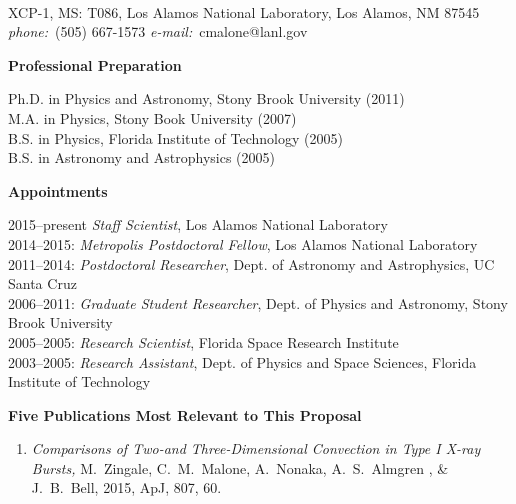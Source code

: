 \documentclass[11pt,letterpaper,english]{article}
\begin{document}
\setlength{\parindent}{0in} %

\pagestyle{fancy}   \renewcommand{%
\headrulewidth}{0.0pt}



\\
{ XCP-1, MS: T086, Los Alamos National Laboratory, Los Alamos, NM 87545} \\
{\it phone:}~(505) 667-1573 \hskip 2mm
{\it e-mail:}~cmalone@lanl.gov \hskip 2mm 

\begin{flushleft} {\bf Professional Preparation}
{\parindent 16pt

Ph.D. in Physics and Astronomy, Stony Brook University (2011)\\ 
M.A. in Physics, Stony Book University (2007)\\ 
B.S. in Physics, Florida Institute of Technology (2005)\\ 
B.S. in Astronomy and Astrophysics (2005)\\
}

\vspace{.04in}
{\bf Appointments}
{\parindent 16pt

2015--present {\em Staff Scientist}, Los Alamos National Laboratory \\
2014--2015: {\em Metropolis Postdoctoral Fellow}, Los Alamos National Laboratory \\ 
2011--2014: {\em Postdoctoral Researcher}, Dept. of Astronomy and Astrophysics, UC Santa Cruz\\ 
2006--2011: {\em Graduate Student Researcher}, Dept. of Physics and Astronomy, Stony Brook University  \\ 
2005--2005: {\em Research Scientist}, Florida Space Research Institute \\
2003--2005: {\em Research Assistant}, Dept. of Physics and Space Sciences, Florida Institute of Technology
}

\vspace{.04in}
{\bf Five Publications Most Relevant to This Proposal}
\vspace{-6pt}
\begin{enumerate} \itemsep1pt \parskip0pt 
\item {\it Comparisons of Two-and Three-Dimensional Convection in Type
  I X-ray Bursts, } M.~Zingale, C.~M.~Malone, A.~Nonaka, A.~S.~Almgren
  , \& J.~B.~Bell, 2015, ApJ, 807, 60.


\end{enumerate}
\end{flushleft}
\end{document}
